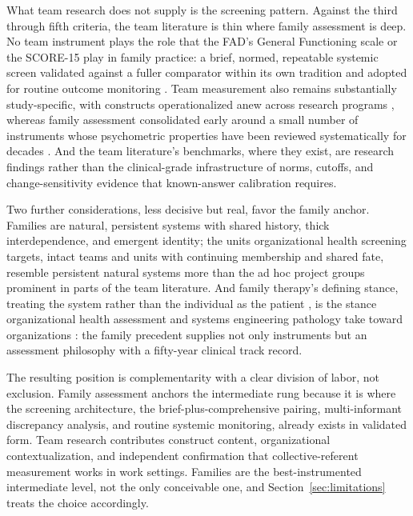 \documentclass[12pt, letterpaper]{article}
\begin{document}
What team research does not supply is the screening pattern. Against the third through fifth criteria, the team literature is thin where family assessment is deep. No team instrument plays the role that the FAD's General Functioning scale or the SCORE-15 play in family practice: a brief, normed, repeatable systemic screen validated against a fuller comparator within its own tradition and adopted for routine outcome monitoring \parencite{boterhovendehaan2015,stratton2014}. Team measurement also remains substantially study-specific, with constructs operationalized anew across research programs \parencite{mathieu2008}, whereas family assessment consolidated early around a small number of instruments whose psychometric properties have been reviewed systematically for decades \parencite{hamilton2016}. And the team literature's benchmarks, where they exist, are research findings rather than the clinical-grade infrastructure of norms, cutoffs, and change-sensitivity evidence that known-answer calibration requires.

Two further considerations, less decisive but real, favor the family anchor. Families are natural, persistent systems with shared history, thick interdependence, and emergent identity; the units organizational health screening targets, intact teams and units with continuing membership and shared fate, resemble persistent natural systems more than the ad hoc project groups prominent in parts of the team literature. And family therapy's defining stance, treating the system rather than the individual as the patient \parencite{minuchin1974,miller2000}, is the stance organizational health assessment and systems engineering pathology take toward organizations \parencite{davidz2018,miles1965}: the family precedent supplies not only instruments but an assessment philosophy with a fifty-year clinical track record.

The resulting position is complementarity with a clear division of labor, not exclusion. Family assessment anchors the intermediate rung because it is where the screening architecture, the brief-plus-comprehensive pairing, multi-informant discrepancy analysis, and routine systemic monitoring, already exists in validated form. Team research contributes construct content, organizational contextualization, and independent confirmation that collective-referent measurement works in work settings. Families are the best-instrumented intermediate level, not the only conceivable one, and Section~\ref{sec:limitations} treats the choice accordingly.
\end{document}
